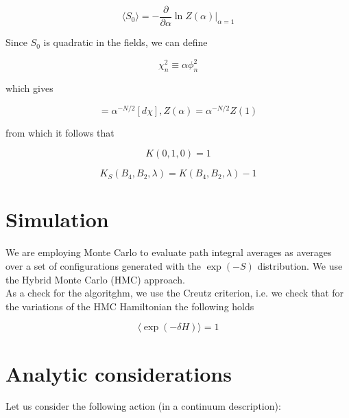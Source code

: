 \documentclass{article}
\begin{document}
\begin{equation}
\langle S_0 \rangle = -\frac{\partial}{\partial \alpha} \ln Z(\alpha) \Bigr|_{\alpha = 1}
\end{equation}

\noindent Since $S_0$ is quadratic in the fields, we can define

\begin{equation}
\chi_n^2 \equiv \alpha \phi_n^2
\end{equation}

\noindent which gives

\begin{equation}
[d\phi] = \alpha^{-N/2} [d\chi], Z(\alpha) = \alpha^{-N/2} Z(1)
\end{equation}

\noindent from which it follows that

\begin{equation}
K(0,1,0) = 1
\end{equation}

\begin{equation}
K_S(B_4, B_2, \lambda) = K(B_4, B_2, \lambda) - 1
\end{equation}

\section{Simulation}

\noindent We are employing Monte Carlo to evaluate path integral averages as averages over a set of configurations
generated with the $\exp(-S)$ distribution. We use the Hybrid Monte Carlo (HMC) approach.\\

\noindent As a check for the algoritghm, we use the Creutz criterion, i.e. we check that for the variations of the HMC Hamiltonian
the following holds

\begin{equation}
\langle \exp \left( - \delta H \right) \rangle = 1
\end{equation}


\section{Analytic considerations}

Let us consider the following action (in a continuum description):
\end{document}
